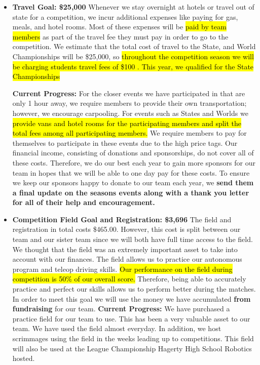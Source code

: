 \begin{itemize}
  \item \textbf{\Large Travel Goal: \$25,000 }
  \newline 
  Whenever we stay overnight at hotels or travel out of state for a competition, we incur additional expenses like paying for gas, meals, and hotel rooms. Most of these expenses will be \hl{paid by team members} as part of the travel fee they must pay in order to go to the competition. We estimate that the total cost of travel to the State, and World Championships will be \$25,000, so \hl{throughout the competition season we will be charging students travel fees of \$100 . This year, we qualified for the State Championships}
  
  \textbf{Current Progress: }
  For the closer events we have participated in that are only 1 hour away, we require members to provide their own transportation; however, we encourage carpooling. For events such as States and Worlds we \hl{provide vans and hotel rooms for the participating members and split the total fees among all participating members.} We require members to pay for themselves to participate in these events due to the high price tags. Our financial income, consisting of donations and sponsorships, do not cover all of these costs. Therefore, we do our best each year to gain more sponsors for our team in hopes that we will be able to one day pay for these costs. To ensure we keep our sponsors happy to donate to our team each year, we \textbf{send them a final update on the seasons events along with a thank you letter for all of their help and encouragement.} 
  \item \textbf{\Large Competition Field Goal and Registration: \$3,696}
  \newline 
   The field and registration in total costs \$465.00. However, this cost is split between our team and our sister team since we will both have full time access to the field. We thought that the field was an extremely important asset to take into account with our finances. The field allows us to practice our autonomous program and teleop driving skills. \hl{Our performance on the field during competition is 50\% of our overall score.} Therefore, being able to accurately practice and perfect our skills allows us to perform better during the matches. In order to meet this goal we will use the money we have accumulated \textbf{from fundraising} for our team.
  \newline 
\textbf{Current Progress:} We have purchased a practice field for our team to use. This has been a very valuable asset to our team. We have used the field almost everyday. In addition, we host scrimmages using the field in the weeks leading up to competitions. This field will also be used at the League Championship Hagerty High School Robotics hosted. 

\end{itemize}
